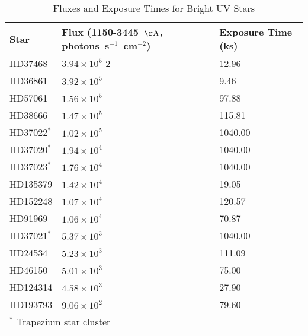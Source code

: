 \begin{table*}
\caption{Fluxes and Exposure Times for Bright UV Stars\label{tab:star_fluxes}}
\begin{center}
\begin{tabular}{lll}
\hline
\hline
Star & Flux (1150-3445~${\rm \AA}$, photons~s$^{-1}$~cm$^{-2}$) & Exposure Time (ks) \\
\hline
HD37468 & $3.94 \times 10^5$ 2 & 12.96 \\
HD36861 & $3.92 \times 10^5$ & 9.46 \\
HD57061 & $1.56 \times 10^5$ & 97.88 \\
HD38666 & $1.47 \times 10^5$ & 115.81 \\
HD37022$^*$ & $1.02 \times 10^5$ & 1040.00 \\
HD37020$^*$ & $1.94 \times 10^4$ & 1040.00 \\
HD37023$^*$ & $1.76 \times 10^4$ & 1040.00 \\
HD135379 & $1.42 \times 10^4$ & 19.05 \\
HD152248 & $1.07 \times 10^4$ & 120.57 \\
HD91969 & $1.06 \times 10^4$ & 70.87 \\
HD37021$^*$ & $5.37 \times 10^3$ & 1040.00 \\
HD24534 & $5.23 \times 10^3$ & 111.09 \\
HD46150 & $5.01 \times 10^3$ & 75.00 \\
HD124314 & $4.58 \times 10^3$ & 27.90 \\
HD193793 & $9.06 \times 10^2$ & 79.60 \\
\hline
\multicolumn{3}{p{.6\textwidth}}{$^*$ Trapezium star cluster}
\end{tabular}
\end{center}
\end{table*}
